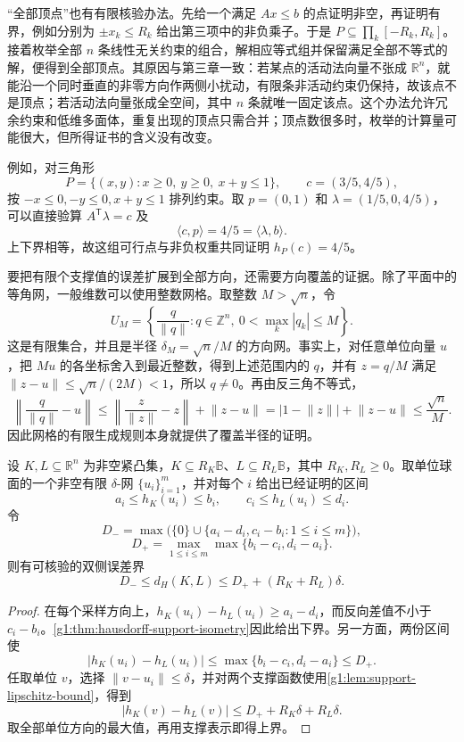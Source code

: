 “全部顶点”也有有限核验办法。先给一个满足 \(Ax\le b\) 的点证明非空，再证明有界，例如分别为 \(\pm x_k\le R_k\) 给出第三项中的非负乘子。于是 \(P\subseteq\prod_k[-R_k,R_k]\)。接着枚举全部 \(n\) 条线性无关约束的组合，解相应等式组并保留满足全部不等式的解，便得到全部顶点。其原因与第三章一致：若某点的活动法向量不张成 \(\mathbb R^n\)，就能沿一个同时垂直的非零方向作两侧小扰动，有限条非活动约束仍保持，故该点不是顶点；若活动法向量张成全空间，其中 \(n\) 条就唯一固定该点。这个办法允许冗余约束和低维多面体，重复出现的顶点只需合并；顶点数很多时，枚举的计算量可能很大，但所得证书的含义没有改变。

\ProseParagraphBreak

例如，对三角形
\[
	P=\{(x,y):x\ge0,\ y\ge0,\ x+y\le1\},\qquad c=(3/5,4/5),
\]
按 \(-x\le0,-y\le0,x+y\le1\) 排列约束。取 \(p=(0,1)\) 和 \(\lambda=(1/5,0,4/5)\)，可以直接验算 \(A^{\mathsf T}\lambda=c\) 及
\[
	\langle c,p\rangle=4/5=\langle\lambda,b\rangle.
\]
上下界相等，故这组可行点与非负权重共同证明 \(h_P(c)=4/5\)。

\ProseParagraphBreak

要把有限个支撑值的误差扩展到全部方向，还需要方向覆盖的证据。除了平面中的等角网，一般维数可以使用整数网格。取整数 \(M>\sqrt n\)，令
\begin{equation}\label{g1:eq:integer-direction-net}
	U_M=\left\{\frac{q}{\lVert q\rVert}:q\in\mathbb Z^n,\ 0<\max_k|q_k|\le M\right\}.
\end{equation}
这是有限集合，并且是半径 \(\delta_M=\sqrt n/M\) 的方向网。事实上，对任意单位向量 \(u\)，把 \(Mu\) 的各坐标舍入到最近整数，得到上述范围内的 \(q\)，并有 \(z=q/M\) 满足 \(\lVert z-u\rVert\le\sqrt n/(2M)<1\)，所以 \(q\ne0\)。再由反三角不等式，
\[
	\left\lVert\frac{q}{\lVert q\rVert}-u\right\rVert
	\le\left\lVert\frac z{\lVert z\rVert}-z\right\rVert+\lVert z-u\rVert
	=|1-\lVert z\rVert|+\lVert z-u\rVert
	\le\frac{\sqrt n}{M}.
\]
因此网格的有限生成规则本身就提供了覆盖半径的证明。

\begin{proposition}\label{g1:prop:finite-support-distance-certificate}
	设 \(K,L\subseteq\mathbb R^n\) 为非空紧凸集，\(K\subseteq R_K\mathbb B\)、\(L\subseteq R_L\mathbb B\)，其中 \(R_K,R_L\ge0\)。取单位球面的一个非空有限 \(\delta\)-网 \(\{u_i\}_{i=1}^m\)，并对每个 \(i\) 给出已经证明的区间
	\[
		a_i\le h_K(u_i)\le b_i,\qquad
		c_i\le h_L(u_i)\le d_i.
	\]
	令
	\[
		D_-=\max\bigl(\{0\}\cup\{a_i-d_i,c_i-b_i:1\le i\le m\}\bigr),
	\]
	\[
		D_+=\max_{1\le i\le m}\max\{b_i-c_i,d_i-a_i\}.
	\]
	则有可核验的双侧误差界
	\begin{equation}\label{g1:eq:finite-support-distance-certificate}
		D_-\le d_H(K,L)\le D_++(R_K+R_L)\delta.
	\end{equation}
\end{proposition}
\begin{proof}
	在每个采样方向上，\(h_K(u_i)-h_L(u_i)\ge a_i-d_i\)，而反向差值不小于 \(c_i-b_i\)。\cref{g1:thm:hausdorff-support-isometry}因此给出下界。另一方面，两份区间使
	\[
		|h_K(u_i)-h_L(u_i)|\le\max\{b_i-c_i,d_i-a_i\}\le D_+.
	\]
	任取单位 \(v\)，选择 \(\lVert v-u_i\rVert\le\delta\)，并对两个支撑函数使用\cref{g1:lem:support-lipschitz-bound}，得到
	\[
		|h_K(v)-h_L(v)|
		\le D_++R_K\delta+R_L\delta.
	\]
	取全部单位方向的最大值，再用支撑表示即得上界。
\end{proof}


